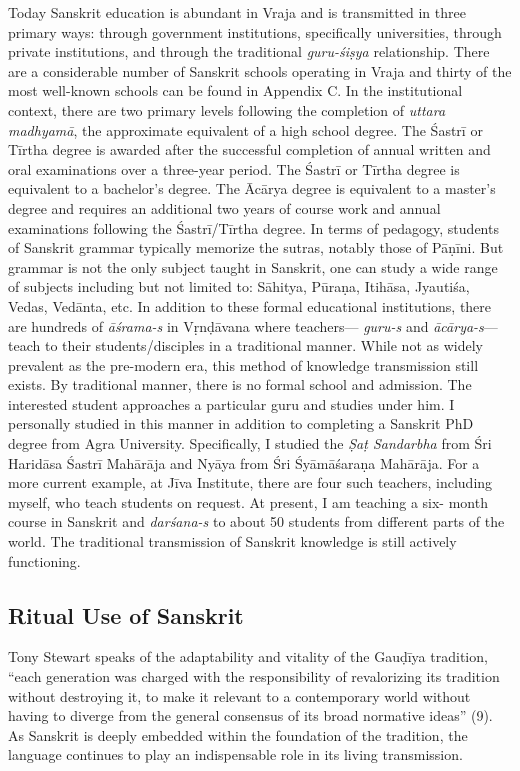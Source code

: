 Today Sanskrit education is abundant in Vraja and is transmitted in three primary ways: through government institutions, specifically universities, through private institutions, and through the traditional {\sl guru-śiṣya} relationship. There are a considerable number of Sanskrit schools operating in Vraja and thirty of the most well-known schools can be found in Appendix C. In the institutional context, there are two primary levels following the completion of {\sl uttara madhyamā}, the approximate equivalent of a high school degree. The Śastrī or Tīrtha degree is awarded after the successful completion of annual written and oral examinations over a three-year period. The Śastrī or Tīrtha degree is equivalent to a bachelor’s degree. The Ācārya degree is equivalent to a master’s degree and requires an additional two years of course work and annual examinations following the Śastrī/Tīrtha degree. In terms of pedagogy, students of Sanskrit grammar typically memorize the sutras, notably those of Pāṇīni. But grammar is not the only subject taught in Sanskrit, one can study a wide range of subjects including but not limited to: Sāhitya, Pūraṇa, Itihāsa, Jyautiśa, Vedas, Vedānta, etc. In addition to these formal educational institutions, there are hundreds of {\sl āśrama-s} in Vṛnḍāvana where teachers— {\sl guru-s} and {\sl ācārya-s}— teach to their students/disciples in a traditional manner. While not as widely prevalent as the pre-modern era, this method of knowledge transmission still exists. By traditional manner, there is no formal school and admission. The interested student approaches a particular guru and studies under him. I personally studied in this manner in addition to completing a Sanskrit PhD degree from Agra University. Specifically, I studied the {\sl Ṣaṭ Sandarbha} from Śri Haridāsa Śastrī Mahārāja and Nyāya from Śri Śyāmāśaraṇa Mahārāja. For a more current example, at Jīva Institute, there are four such teachers, including myself, who teach students on request. At present, I am teaching a six- month course in Sanskrit and {\sl darśana-s} to about 50 students from different parts of the world. The traditional transmission of Sanskrit knowledge is still actively functioning. 

\subsection*{Ritual Use of Sanskrit }
\vskip -5pt

Tony Stewart speaks of the adaptability and vitality of the Gauḍīya tradition, “each generation was charged with the responsibility of revalorizing its tradition without destroying it, to make it relevant to a contemporary world without having to diverge from the general consensus of its broad normative ideas” (9). As Sanskrit is deeply embedded within the foundation of the tradition, the language continues to play an indispensable role in its living transmission. 

